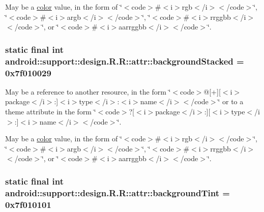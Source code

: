 May be a \hyperlink{classandroid_1_1support_1_1design_1_1_r_1_1color}{color} value, in the form of \char`\"{}$<$code$>$\#$<$i$>$rgb$<$/i$>$$<$/code$>$\char`\"{}, \char`\"{}$<$code$>$\#$<$i$>$argb$<$/i$>$$<$/code$>$\char`\"{}, \char`\"{}$<$code$>$\#$<$i$>$rrggbb$<$/i$>$$<$/code$>$\char`\"{}, or \char`\"{}$<$code$>$\#$<$i$>$aarrggbb$<$/i$>$$<$/code$>$\char`\"{}. \hypertarget{classandroid_1_1support_1_1design_1_1_r_1_1attr_ee3f884d5f265352224e86ab5033c656}{
\subsubsection[{backgroundStacked}]{\setlength{\rightskip}{0pt plus 5cm}static final int android::support::design.R.R::attr::backgroundStacked = 0x7f010029}}
\label{classandroid_1_1support_1_1design_1_1_r_1_1attr_ee3f884d5f265352224e86ab5033c656}


May be a reference to another resource, in the form \char`\"{}$<$code$>$@\mbox{[}+\mbox{]}\mbox{[}$<$i$>$package$<$/i$>$:\mbox{]}$<$i$>$type$<$/i$>$:$<$i$>$name$<$/i$>$$<$/code$>$\char`\"{} or to a theme attribute in the form \char`\"{}$<$code$>$?\mbox{[}$<$i$>$package$<$/i$>$:\mbox{]}\mbox{[}$<$i$>$type$<$/i$>$:\mbox{]}$<$i$>$name$<$/i$>$$<$/code$>$\char`\"{}. 

May be a \hyperlink{classandroid_1_1support_1_1design_1_1_r_1_1color}{color} value, in the form of \char`\"{}$<$code$>$\#$<$i$>$rgb$<$/i$>$$<$/code$>$\char`\"{}, \char`\"{}$<$code$>$\#$<$i$>$argb$<$/i$>$$<$/code$>$\char`\"{}, \char`\"{}$<$code$>$\#$<$i$>$rrggbb$<$/i$>$$<$/code$>$\char`\"{}, or \char`\"{}$<$code$>$\#$<$i$>$aarrggbb$<$/i$>$$<$/code$>$\char`\"{}. \hypertarget{classandroid_1_1support_1_1design_1_1_r_1_1attr_532c4b833a8e1976003220d27ea6f860}{
\subsubsection[{backgroundTint}]{\setlength{\rightskip}{0pt plus 5cm}static final int android::support::design.R.R::attr::backgroundTint = 0x7f010101}}
\label{classandroid_1_1support_1_1design_1_1_r_1_1attr_532c4b833a8e1976003220d27ea6f860}


